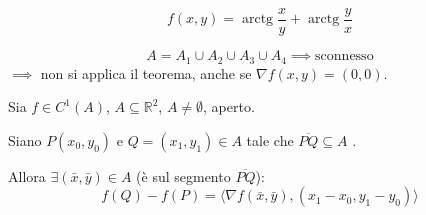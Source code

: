 \begin{example*}[Controesempio]
\[
f(x, y) = \operatorname{arctg} \frac{x}{y} + \operatorname{arctg} \frac{y}{x}
\]
\begin{center}
\end{center}
\[
A = A_1 \cup A_2 \cup A_3 \cup A_4 \implies \text{sconnesso}
\]
$\implies$ non si applica il teorema, anche se $\nabla f(x, y) = (0, 0)$.
\end{example*}

\begin{theorem}
Sia $f \in C^1(A)$, $A \subseteq \mathbb{R}^2$, $A \neq \emptyset$, aperto.

Siano $P(x_0, y_0)$ e $Q = (x_1, y_1) \in A$ tale che $\overline{PQ} \subseteq A$ .

Allora $\exists (\bar{x}, \bar{y}) \in A$ (è sul segmento $\overline{PQ}$):
\[
f(Q) - f(P) = \langle \nabla f(\bar{x}, \bar{y}), (x_1 - x_0, y_1 - y_0) \rangle
\]
\end{theorem}
